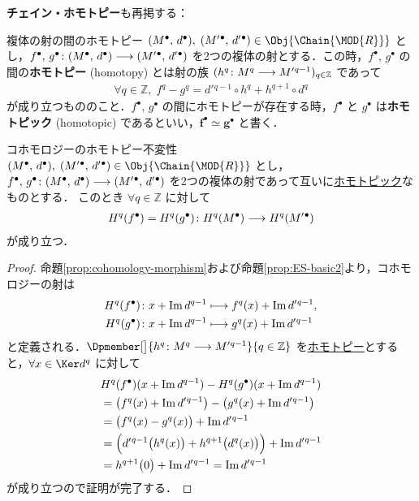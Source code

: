 \documentclass[algtopo_main]{subfiles}
\begin{document}
\textbf{チェイン・ホモトピー}も再掲する：

\begin{mydef}[label=def:chain-homotopy]{複体の射の間のホモトピー}
    $(M^\bullet,\, d^\bullet),\; (M'{}^\bullet,\, d'{}^\bullet) \in \Obj{\Chain{\MOD{R}}}$ とし，$f^\bullet,\, g^\bullet \colon (M^\bullet,\, d^\bullet) \longrightarrow (M'{}^\bullet,\, d'{}^\bullet)$ を2つの複体の射とする．この時，$f^\bullet,\, g^\bullet$ の間の\textbf{ホモトピー} (homotopy) とは射の族 $(h^q \colon M^q \longrightarrow M'{}^{q-1})_{q \in \mathbb{Z}}$ であって
    \begin{align}
        \forall q \in \mathbb{Z},\; f^q - g^q = d'{}^{q-1} \circ h^q + h^{q+1} \circ d^q
    \end{align}
    が成り立つもののこと．$f^\bullet,\, g^\bullet$ の間にホモトピーが存在する時，$f^\bullet$ と $g^\bullet$ は\textbf{ホモトピック} (homotopic) であるといい，$\bm{f^\bullet \simeq g^\bullet}$ と書く．
\end{mydef}

\begin{myprop}[label=prop:homotopic-basic]{コホモロジーのホモトピー不変性}
    $(M^\bullet,\, d^\bullet),\; (M'{}^\bullet,\, d'{}^\bullet) \in \Obj{\Chain{\MOD{R}}}$ とし，$f^\bullet,\, g^\bullet \colon (M^\bullet,\, d^\bullet) \longrightarrow (M'{}^\bullet,\, d'{}^\bullet)$ を2つの複体の射であって互いに\hyperref[def:chain-homotopy]{ホモトピック}なものとする．
    このとき $\forall q \in \mathbb{Z}$ に対して
    \begin{align}
        H^q(f^\bullet) = H^q(g^\bullet) \colon H^q(M^\bullet) \longrightarrow H^q(M'{}^\bullet)
    \end{align}
    が成り立つ．
\end{myprop}

\begin{proof}
    命題\ref{prop:cohomology-morphism}および命題\ref{prop:ES-basic2}より，コホモロジーの射は
    \begin{align}
        H^q(f^\bullet) &\colon x + \Im d^{q-1} \longmapsto f^q(x) + \Im d'{}^{q-1}, \\
        H^q(g^\bullet) &\colon x + \Im d^{q-1} \longmapsto g^q(x) + \Im d'{}^{q-1}
    \end{align}
    と定義される．$\Dpmember[\big]{h^q \colon M^q \lto M'{}^{q-1}}{q \in \mathbb{Z}}$ を\hyperref[def:chain-homotopy]{ホモトピー}とすると，$\forall x \in \Ker d^q$ に対して
    \begin{align}
        &H^q(f^\bullet) (x + \Im d^{q-1}) - H^q(g^\bullet)(x + \Im d^{q-1}) \\
        &= \bigl(f^q(x) + \Im d'{}^{q-1}\bigr) - \bigl( g^q(x) + \Im d'{}^{q-1} \bigr) \\
        &= \bigl( f^q(x) - g^q(x) \bigr) + \Im d'{}^{q-1} \\
        &= \Bigl( d'{}^{q-1} \bigl( h^q(x) \bigr) + h^{q+1} \bigl( d^q(x) \bigr)   \Bigr)  + \Im d'{}^{q-1} \\
        &= h^{q+1} \bigl( 0 \bigr) + \Im d'{}^{q-1} = \Im d'{}^{q-1}
    \end{align}
    が成り立つので証明が完了する．
\end{proof}
\end{document}
